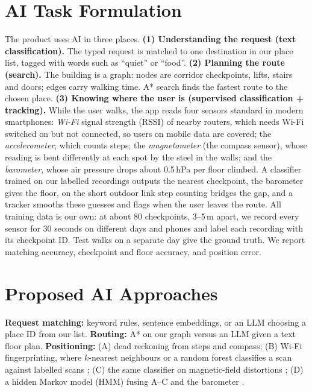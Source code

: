 \documentclass{article}
\begin{document}
\section{AI Task Formulation}
The product uses AI in three places.
\textbf{(1) Understanding the request (text classification).} The typed request is matched to one destination in our place list, tagged with words such as ``quiet'' or ``food''.
\textbf{(2) Planning the route (search).} The building is a graph: nodes are corridor checkpoints, lifts, stairs and doors; edges carry walking time. A* search finds the fastest route to the chosen place.
\textbf{(3) Knowing where the user is (supervised classification + tracking).} While the user walks, the app reads four sensors standard in modern smartphones: \emph{Wi-Fi} signal strength (RSSI) of nearby routers, which needs Wi-Fi switched on but not connected, so users on mobile data are covered; the \emph{accelerometer}, which counts steps; the \emph{magnetometer} (the compass sensor), whose reading is bent differently at each spot by the steel in the walls; and the \emph{barometer}, whose air pressure drops about 0.5\,hPa per floor climbed. A classifier trained on our labelled recordings outputs the nearest checkpoint, the barometer gives the floor, on the short outdoor link step counting bridges the gap, and a tracker smooths these guesses and flags when the user leaves the route.
All training data is our own: at about 80 checkpoints, 3--5\,m apart, we record every sensor for 30 seconds on different days and phones and label each recording with its checkpoint ID. Test walks on a separate day give the ground truth. We report matching accuracy, checkpoint and floor accuracy, and position error.

\section{Proposed AI Approaches}
\textbf{Request matching:} keyword rules, sentence embeddings, or an LLM choosing a place ID from our list. \textbf{Routing:} A* \cite{hart1968} on our graph versus an LLM given a text floor plan. \textbf{Positioning:} (A) dead reckoning from steps and compass; (B) Wi-Fi fingerprinting, where $k$-nearest neighbours or a random forest classifies a scan against labelled scans \cite{bahl2000}; (C) the same classifier on magnetic-field distortions \cite{haverinen2009}; (D) a hidden Markov model (HMM) fusing A--C and the barometer \cite{rabiner1989}.
\end{document}
